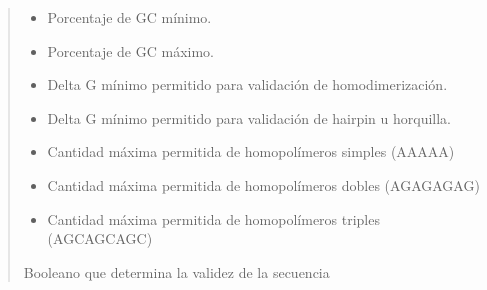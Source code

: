 \documentclass[letterpaper,10pt,spanish]{sphinxmanual}
\begin{document}
\begin{fulllineitems}
\begin{quote}
\begin{description}
\begin{itemize}
\item {} 
\sphinxAtStartPar
{} \textendash{} Porcentaje de GC mínimo.

\item {} 
\sphinxAtStartPar
{} \textendash{} Porcentaje de GC máximo.

\item {} 
\sphinxAtStartPar
{} \textendash{} Delta G mínimo permitido para validación de homodimerización.

\item {} 
\sphinxAtStartPar
{} \textendash{} Delta G mínimo permitido para validación de hairpin u horquilla.

\item {} 
\sphinxAtStartPar
{} \textendash{} Cantidad máxima permitida de homopolímeros simples (AAAAA)

\item {} 
\sphinxAtStartPar
{} \textendash{} Cantidad máxima permitida de homopolímeros dobles (AGAGAGAG)

\item {} 
\sphinxAtStartPar
{} \textendash{} Cantidad máxima permitida de homopolímeros triples (AGCAGCAGC)

\end{itemize}

\sphinxAtStartPar
Booleano que determina la validez de la secuencia

\end{description}\end{quote}

\end{fulllineitems}

\end{document}
